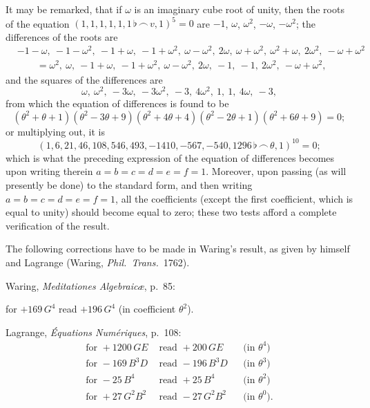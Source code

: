 \documentclass[11pt,a4paper]{article}
\theoremstyle{definition}
\begin{document}
It may be remarked, that if $\omega$ is an imaginary cube root of unity, then the roots of the equation $(1,1,1,1,1,1\,\flat\,\frown\, v,1)^5=0$ are $-1$, $\omega$, $\omega^2$, $-\omega$, $-\omega^2$; the differences of the roots are
\begin{align*}
&-1-\omega,\ -1-\omega^2,\ -1+\omega,\ -1+\omega^2,\ \omega-\omega^2,\ 2\omega,\ \omega+\omega^2,\ \omega^2+\omega,\ 2\omega^2,\ -\omega+\omega^2\\
&\qquad=\omega^2,\ \omega,\ -1+\omega,\ -1+\omega^2,\ \omega-\omega^2,\ 2\omega,\ -1,\ -1,\ 2\omega^2,\ -\omega+\omega^2,
\end{align*}
and the squares of the differences are
\[
\omega,\ \omega^2,\ -3\omega,\ -3\omega^2,\ -3,\ 4\omega^2,\ 1,\ 1,\ 4\omega,\ -3,
\]
from which the equation of differences is found to be
\[
(\theta^2+\theta+1)(\theta^2-3\theta+9)(\theta^2+4\theta+4)(\theta^2-2\theta+1)(\theta^2+6\theta+9)=0;
\]
or multiplying out, it is
\[
(1,6,21,46,108,546,493,-1410,-567,-540,1296\,\flat\,\frown\,\theta,1)^{10}=0;
\]
which is what the preceding expression of the equation of differences becomes upon writing therein $a=b=c=d=e=f=1$. Moreover, upon passing (as will presently be done) to the standard form, and then writing $a=b=c=d=e=f=1$, all the coefficients (except the first coefficient, which is equal to unity) should become equal to zero; these two tests afford a complete verification of the result.

The following corrections have to be made in Waring's result, as given by himself and Lagrange (Waring, \textit{Phil.\ Trans.}\ 1762).

Waring, \textit{Meditationes Algebraic\ae}, p.~85:

for $+169\,G^4$ read $+196\,G^4$ (in coefficient $\theta^2$).

Lagrange, \textit{\'{E}quations Num\'{e}riques}, p.~108:
\begin{align*}
\text{for }+1200\,GE &\text{ read }+200\,GE &&\text{(in $\theta^4$)}\\
\text{for }-169\,B^3D &\text{ read }-196\,B^3D &&\text{(in $\theta^3$)}\\
\text{for }-25\,B^4 &\text{ read }+25\,B^4 &&\text{(in $\theta^2$)}\\
\text{for }+27\,G^2B^2 &\text{ read }-27\,G^2B^2 &&\text{(in $\theta^0$)}.
\end{align*}
\end{document}
